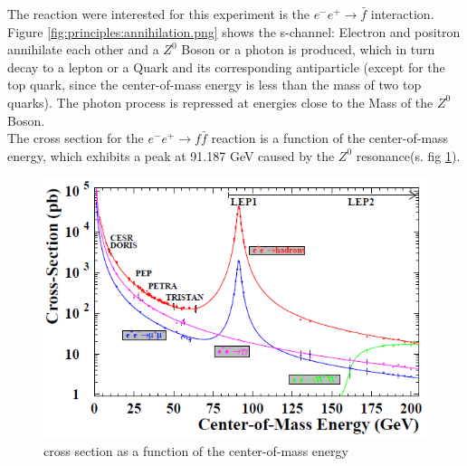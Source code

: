 The reaction were interested for this experiment is the $e^-e^+\rightarrow\bar{f}$ interaction. Figure \ref{fig:principles:annihilation.png} shows the s-channel: Electron and positron annihilate each other and a $Z^0$ Boson or a photon is produced, which in turn decay to a lepton or a Quark and its corresponding antiparticle (except for the top quark, since the center-of-mass energy is less than the mass of two top quarks). The photon process is repressed at energies close to the Mass of the $Z^0$ Boson\cite{muenchen}.\\%
The cross section for the $e^-e^+\rightarrow f\bar{f}$ reaction is a function of the center-of-mass energy, which exhibits a peak at 91.187 GeV caused by the $Z^0$ resonance(s. fig \ref{fig:principles:crosssection}).
\begin{figure}[H]
\centering
\includegraphics[width=\linewidth]{graphics/crosssection}
\caption{cross section as a function of the center-of-mass energy}
\label{fig:principles:crosssection}
\end{figure}

